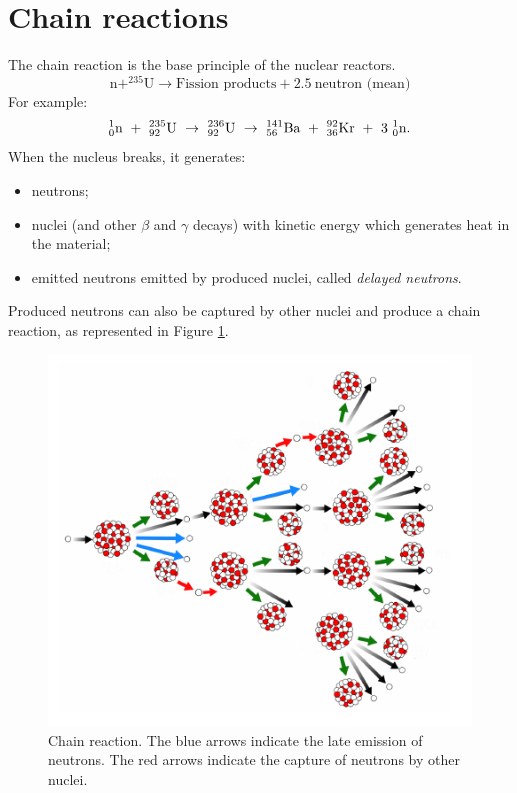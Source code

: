 \section{Chain reactions}
The chain reaction is the base principle of the nuclear reactors.
\begin{equation*}
    \mbox{n} + ^{235}\mbox{U} \rightarrow 
    \mbox{Fission products} + 2.5 ~\mbox{neutron (mean)}
\end{equation*}
For example:
\begin{equation*}
    _{\tiny{0}}^{\tiny{1}}\mbox{n} ~+~ _{\tiny{92}}^{\tiny{235}}\mbox{U}~ \rightarrow~ _{\tiny{92}}^{\tiny{236}}\mbox{U}~ \rightarrow~
    _{\tiny{56}}^{\tiny{141}}\mbox{Ba} ~+~ _{\tiny{36}}^{\tiny{92}}\mbox{Kr} ~+~ 3~_{\tiny{0}}^{\tiny{1}}\mbox{n}.
\end{equation*}
When the nucleus breaks, it generates:
\begin{itemize}
    \item neutrons;
    \item nuclei (and other $\beta$ and $\gamma$ decays) with kinetic energy which generates heat in the material; 
    \item emitted neutrons emitted by produced nuclei, called \emph{delayed neutrons}.
\end{itemize}
Produced neutrons can also be captured by other nuclei and produce a chain reaction, as represented in Figure \ref{fig:nuclear-physics3-fig6}.

\begin{figure}
    \centering
    \includegraphics[scale=1.2]{Figures/nuclear-physics3-fig6.pdf}
    \caption{Chain reaction. The blue arrows indicate the late emission of neutrons. The red arrows indicate the capture of neutrons by other nuclei.}
    \label{fig:nuclear-physics3-fig6}
\end{figure}

